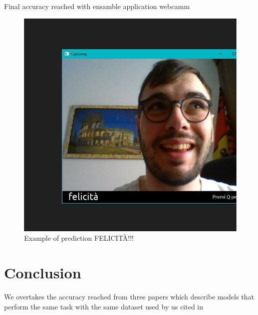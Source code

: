 \documentclass[10pt,twocolumn,letterpaper]{article}
\begin{document}
Final accuracy reached with ensamble
application webcamm

\begin{figure}[H]
   \centering
   \includegraphics[width=1\linewidth]{./immagini/felicita.jpg}
   \caption{Example of prediction FELICITÀ!!!}
\end{figure}

\section{Conclusion}

We overtakes the accuracy reached from three papers which describe models that perform the same task with the same dataset used by us cited in \cite{paper}




\newpage
{\small
   
   
}
\end{document}
